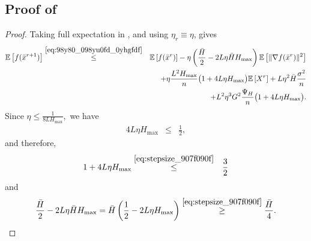 \documentclass{article}
\newcommand{\Exp}[1]{{\mathbb{E}} \left[ #1 \right]}
\theoremstyle{plain}
\theoremstyle{definition}
\begin{document}
\subsection{Proof of } %
\label{sub:proof_of_thm:main}

\maintheorem*

\begin{proof}
    Taking full expectation in , and using
    \(\eta_r\equiv\eta\), gives
    \begin{eqnarray}
    \Exp{f(\bar x^{r+1})}
    &\overset{\eqref{eq:98y80_098yu0fd_0yhgfdf}}{\leq}&
    \Exp{f(\bar x^r)}
    -
    \eta\left(\frac{\bar H}{2}-2L\eta\bar H H_{\max}\right)
    \Exp{\|\nabla f(\bar x^r)\|^2}
    \notag\\
    &&+
    \eta\frac{L^2H_{\max}}{n}
    \bigl(1+4L\eta H_{\max}\bigr)\Exp{X^r}
    +
    L\eta^2\bar H\frac{\sigma^2}{n}
    \notag\\
    &&+
    L^2\eta^3G^2\frac{\Psi_H}{n}
    \bigl(1+4L\eta H_{\max}\bigr).
    \label{eq:n98yf09_09u8f09dug}
    \end{eqnarray}
    Since
    \(
    \eta \leq \frac{1}{8LH_{\max}},
    \)
    we have
    \begin{eqnarray}
    4L\eta H_{\max} &\leq & \frac{1}{2},
    \label{eq:stepsize_907f090f}
    \end{eqnarray}
    and therefore,
    \begin{eqnarray}
    1+4L\eta H_{\max}
    &\overset{\eqref{eq:stepsize_907f090f}}{\leq}&
    \frac{3}{2}
    \label{eq:stepsize-factor-bound}
    \end{eqnarray}
    and
    \begin{eqnarray}
    \frac{\bar H}{2}-2L\eta\bar H H_{\max}
    =
    \bar H\left(\frac{1}{2}-2L\eta H_{\max}\right)
    \overset{\eqref{eq:stepsize_907f090f}}{\geq}
    \frac{\bar H}{4}.
    \label{eq:stepsize-gradient-coeff}
    \end{eqnarray}


\end{proof}
\end{document}
